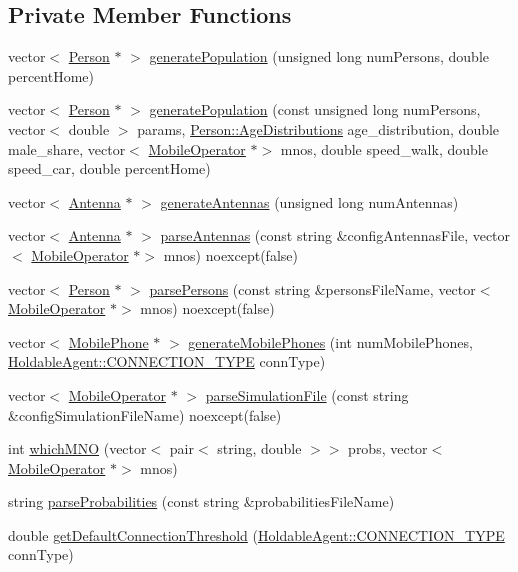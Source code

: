 \subsection*{Private Member Functions}
\begin{DoxyCompactItemize}
\item 
vector$<$ \hyperlink{class_person}{Person} $\ast$ $>$ \hyperlink{class_world_ada780d7d546a1dad038c83aad3f696df}{generate\+Population} (unsigned long num\+Persons, double percent\+Home)
\item 
vector$<$ \hyperlink{class_person}{Person} $\ast$ $>$ \hyperlink{class_world_a7648b24daba6b22f7fe85d5b1dc53d5e}{generate\+Population} (const unsigned long num\+Persons, vector$<$ double $>$ params, \hyperlink{class_person_a53376a9a5852ec7760488a01c37f0b0b}{Person\+::\+Age\+Distributions} age\+\_\+distribution, double male\+\_\+share, vector$<$ \hyperlink{class_mobile_operator}{Mobile\+Operator} $\ast$$>$ mnos, double speed\+\_\+walk, double speed\+\_\+car, double percent\+Home)
\item 
vector$<$ \hyperlink{class_antenna}{Antenna} $\ast$ $>$ \hyperlink{class_world_adbd58c8093be1ac349d929d9a4bc2ab0}{generate\+Antennas} (unsigned long num\+Antennas)
\item 
vector$<$ \hyperlink{class_antenna}{Antenna} $\ast$ $>$ \hyperlink{class_world_aebe7c211a9ddae90773f6ec880cdca15}{parse\+Antennas} (const string \&config\+Antennas\+File, vector$<$ \hyperlink{class_mobile_operator}{Mobile\+Operator} $\ast$$>$ mnos) noexcept(false)
\item 
vector$<$ \hyperlink{class_person}{Person} $\ast$ $>$ \hyperlink{class_world_a70efdf2e1864a9711b168d0677179b34}{parse\+Persons} (const string \&persons\+File\+Name, vector$<$ \hyperlink{class_mobile_operator}{Mobile\+Operator} $\ast$$>$ mnos) noexcept(false)
\item 
vector$<$ \hyperlink{class_mobile_phone}{Mobile\+Phone} $\ast$ $>$ \hyperlink{class_world_a9ba6bd08d85c5f610ea30bf4f74b925d}{generate\+Mobile\+Phones} (int num\+Mobile\+Phones, \hyperlink{class_holdable_agent_ae2c334b004d7b9c5a999cf2618e4e518}{Holdable\+Agent\+::\+C\+O\+N\+N\+E\+C\+T\+I\+O\+N\+\_\+\+T\+Y\+PE} conn\+Type)
\item 
vector$<$ \hyperlink{class_mobile_operator}{Mobile\+Operator} $\ast$ $>$ \hyperlink{class_world_adef43cc4ccb918aa68c00ee1e3286321}{parse\+Simulation\+File} (const string \&config\+Simulation\+File\+Name) noexcept(false)
\item 
int \hyperlink{class_world_a9a982977a44c9e8a4724eaa1e4108679}{which\+M\+NO} (vector$<$ pair$<$ string, double $>$$>$ probs, vector$<$ \hyperlink{class_mobile_operator}{Mobile\+Operator} $\ast$$>$ mnos)
\item 
string \hyperlink{class_world_a5675c3a896891827dd59255a9761f08e}{parse\+Probabilities} (const string \&probabilities\+File\+Name)
\item 
double \hyperlink{class_world_a5975f2673e84c87f8640737efd04590b}{get\+Default\+Connection\+Threshold} (\hyperlink{class_holdable_agent_ae2c334b004d7b9c5a999cf2618e4e518}{Holdable\+Agent\+::\+C\+O\+N\+N\+E\+C\+T\+I\+O\+N\+\_\+\+T\+Y\+PE} conn\+Type)
\end{DoxyCompactItemize}
